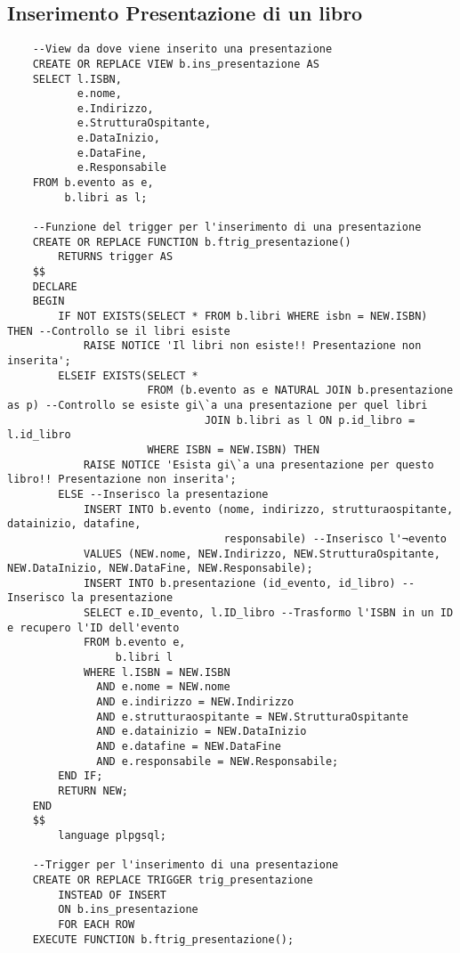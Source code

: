 \subsection{Inserimento Presentazione di un libro}
\begin{lstlisting}
    --View da dove viene inserito una presentazione
    CREATE OR REPLACE VIEW b.ins_presentazione AS
    SELECT l.ISBN,
           e.nome,
           e.Indirizzo,
           e.StrutturaOspitante,
           e.DataInizio,
           e.DataFine,
           e.Responsabile
    FROM b.evento as e,
         b.libri as l;
    
    --Funzione del trigger per l'inserimento di una presentazione
    CREATE OR REPLACE FUNCTION b.ftrig_presentazione()
        RETURNS trigger AS
    $$
    DECLARE
    BEGIN
        IF NOT EXISTS(SELECT * FROM b.libri WHERE isbn = NEW.ISBN) THEN --Controllo se il libri esiste
            RAISE NOTICE 'Il libri non esiste!! Presentazione non inserita';
        ELSEIF EXISTS(SELECT *
                      FROM (b.evento as e NATURAL JOIN b.presentazione as p) --Controllo se esiste gi\`a una presentazione per quel libri
                               JOIN b.libri as l ON p.id_libro = l.id_libro
                      WHERE ISBN = NEW.ISBN) THEN
            RAISE NOTICE 'Esista gi\`a una presentazione per questo libro!! Presentazione non inserita';
        ELSE --Inserisco la presentazione
            INSERT INTO b.evento (nome, indirizzo, strutturaospitante, datainizio, datafine,
                                  responsabile) --Inserisco l'¬evento
            VALUES (NEW.nome, NEW.Indirizzo, NEW.StrutturaOspitante, NEW.DataInizio, NEW.DataFine, NEW.Responsabile);
            INSERT INTO b.presentazione (id_evento, id_libro) --Inserisco la presentazione
            SELECT e.ID_evento, l.ID_libro --Trasformo l'ISBN in un ID e recupero l'ID dell'evento
            FROM b.evento e,
                 b.libri l
            WHERE l.ISBN = NEW.ISBN
              AND e.nome = NEW.nome
              AND e.indirizzo = NEW.Indirizzo
              AND e.strutturaospitante = NEW.StrutturaOspitante
              AND e.datainizio = NEW.DataInizio
              AND e.datafine = NEW.DataFine
              AND e.responsabile = NEW.Responsabile;
        END IF;
        RETURN NEW;
    END
    $$
        language plpgsql;
    
    --Trigger per l'inserimento di una presentazione
    CREATE OR REPLACE TRIGGER trig_presentazione
        INSTEAD OF INSERT
        ON b.ins_presentazione
        FOR EACH ROW
    EXECUTE FUNCTION b.ftrig_presentazione();
\end{lstlisting}

